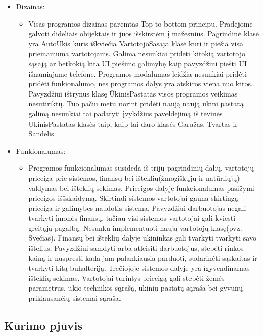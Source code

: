 \documentclass[oneside]{VUMIFPSkursinis}
\begin{document}
	\begin{itemize}
		\item Dizainas:
			\begin{itemize}
				\item Visas programos dizainas paremtas Top to bottom principu. Pradėjome galvoti dideliais obijektais ir juos išskirstėm į mažesnius. Pagrindinė klasė yra AutoUkis kuris iškviečia VartotojoSasaja klasė kuri ir piešia visa prieinamuma vartotojams. Galima nesunkiai pridėti kitokią vartotojo sąsają ar betkokią kita UI piešimo galimybę kaip pavyzdžiui piešti UI išnamiąjame telefone. Programos modalumas leidžia nesunkiai pridėti pridėti funkionalumo, nes programos dalys yra atskiros viena nuo kitos. Pavyzdžiui ištrynus klasę ŪkinisPastatas visos programos veikimas nesutiriktų. Tuo pačiu metu norint pridėti naują naują ūkini pastatą galimą nesunkiai tai padaryti įvykdžius paveldėjimą iš tėvinės UkinisPastatas klasės taip, kaip tai daro klasės Garažas, Tvartas ir Sandelis.  
			\end{itemize}
		\item Funkionalumas: 
			\begin{itemize}
				\item Programos funkcionalumas susideda iš trijų pagrindinių dalių, vartotojų prieeiga prie sistemos, finansų bei išteklių(žmogiškųjų ir natūrliųjų) valdymas bei išteklių sekimas. Prieeigos dalyje funkcionalumas pasižymi prieeigos iššskaidymą. Skirtindi sistemos vartotojai gauna skirtingą prieeiga ir galimybes naudotis sistema. Pavyzdžiui darbuotojas negali tvarkyti įmonės finansų, tačiau visi sistemos vartotojai gali kviesti greitąją pagalbą. Nesunku implementuoti naują vartotojų klasę(pvz. Svečias). Finansų bei išteklių dalyje ūkininkas gali tvarkyti tvarkyti savo ištelius. Pavyzdžiui samdyti arba atleisiti darbuotojus, stebėti rinkos kainą ir nuspresti kada jam palankiausia parduoti, sudarinėti sąskaitas ir tvarkyti kitą buhalteriją. Trečiojoje sistemos dalyje yra įgyvendinamas išteklių sekimas. Vartotojai turintys prieeigą gali stebėti žemės parametrus, ūkio technikos sąrašą, ūkinių pastatų sąraša bei gyvūnų priklausančių sistemai sąraša.
			\end{itemize}

	\end{itemize}

\subsection{Kūrimo pjūvis}
\end{document}
